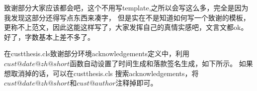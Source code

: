 
\begin{acknowledgements}

致谢部分大家应该都会吧，这个不用写template,之所以会写这么多，完全是因为我发现这部分还得写点东西来凑字，
但是实在不是知道如何写一个致谢的模板，更称不上范文，因此这能这样写了，大家发挥自己的真情实感吧，文言文都ok。
好了，字数基本上差不多了。

在custthesis.cls致谢部分环境acknowledgements定义中，利用$cust@date@zh@short$函数自动设置了时间生成和落款签名生成，如下所示。
如果想取消掉的话，可以在custthesis.cls 搜索acknowledgements，将$cust@date@zh@short$和$cust@author$注释掉即可。
\end{acknowledgements}
